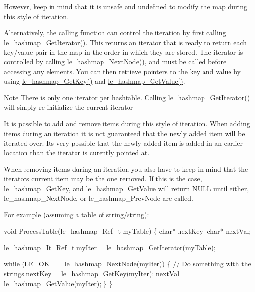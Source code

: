 However, keep in mind that it is unsafe and undefined to modify the map during this style of iteration.

Alternatively, the calling function can control the iteration by first calling {\ttfamily \hyperlink{le__hashmap_8h_a8fb1d3a3d4c4b1b52a45205ac11a12c1}{le\+\_\+hashmap\+\_\+\+Get\+Iterator()}}. This returns an iterator that is ready to return each key/value pair in the map in the order in which they are stored. The iterator is controlled by calling {\ttfamily \hyperlink{le__hashmap_8h_a601b7d3e5d92e91e4090d726e5b190ca}{le\+\_\+hashmap\+\_\+\+Next\+Node()}}, and must be called before accessing any elements. You can then retrieve pointers to the key and value by using \hyperlink{le__hashmap_8h_a8c983aea3bfa393419b4ea26cfe35f42}{le\+\_\+hashmap\+\_\+\+Get\+Key()} and \hyperlink{le__hashmap_8h_aefd09b502200c3260a047cb12097e8ad}{le\+\_\+hashmap\+\_\+\+Get\+Value()}.

\begin{DoxyNote}{Note}
There is only one iterator per hashtable. Calling \hyperlink{le__hashmap_8h_a8fb1d3a3d4c4b1b52a45205ac11a12c1}{le\+\_\+hashmap\+\_\+\+Get\+Iterator()} will simply re-\/initialize the current iterator
\end{DoxyNote}
It is possible to add and remove items during this style of iteration. When adding items during an iteration it is not guaranteed that the newly added item will be iterated over. It\textquotesingle{}s very possible that the newly added item is added in an earlier location than the iterator is curently pointed at.

When removing items during an iteration you also have to keep in mind that the iterator\textquotesingle{}s current item may be the one removed. If this is the case, le\+\_\+hashmap\+\_\+\+Get\+Key, and le\+\_\+hashmap\+\_\+\+Get\+Value will return N\+U\+L\+L until either, le\+\_\+hashmap\+\_\+\+Next\+Node, or le\+\_\+hashmap\+\_\+\+Prev\+Node are called.

For example (assuming a table of string/string)\+:


\begin{DoxyCode}
\textcolor{keywordtype}{void} ProcessTable(\hyperlink{le__hashmap_8h_ae81c60860dbdb8c59beaf25985e5605a}{le\_hashmap\_Ref\_t} myTable)
\{
    \textcolor{keywordtype}{char}* nextKey;
    \textcolor{keywordtype}{char}* nextVal;

    \hyperlink{le__hashmap_8h_a8ab2021261a368add28c1be14f248459}{le\_hashmap\_It\_Ref\_t} myIter = \hyperlink{le__hashmap_8h_a8fb1d3a3d4c4b1b52a45205ac11a12c1}{le\_hashmap\_GetIterator}(myTable);

    \textcolor{keywordflow}{while} (\hyperlink{le__basics_8h_a1cca095ed6ebab24b57a636382a6c86ca5066a4bcec691c6b67843b8f79656422}{LE\_OK} == \hyperlink{le__hashmap_8h_a601b7d3e5d92e91e4090d726e5b190ca}{le\_hashmap\_NextNode}(myIter))
    \{
        \textcolor{comment}{// Do something with the strings}
        nextKey = \hyperlink{le__hashmap_8h_a8c983aea3bfa393419b4ea26cfe35f42}{le\_hashmap\_GetKey}(myIter);
        nextVal = \hyperlink{le__hashmap_8h_aefd09b502200c3260a047cb12097e8ad}{le\_hashmap\_GetValue}(myIter);
    \}
\}
\end{DoxyCode}



